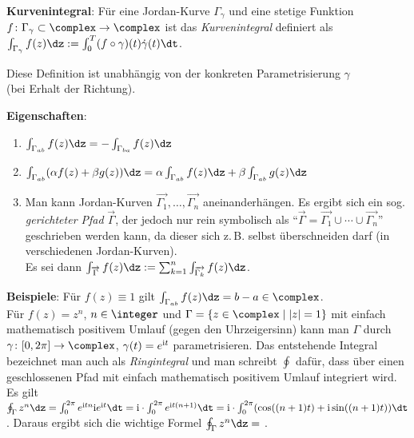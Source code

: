 \textbf{Kurvenintegral}:
Für eine Jordan-Kurve $\Gamma_\gamma$ und eine stetige Funktion
$f\colon \Gamma_\gamma \subset \complex \rightarrow \complex$ ist das
\emph{Kurvenintegral} definiert als $\int_{\Gamma_\gamma} f(z)\dz
:= \int_0^T (f \circ \gamma)(t) \dot{\gamma}(t) \dt$.

Diese Definition ist unabhängig von der konkreten Parametrisierung $\gamma$\\
(bei Erhalt der Richtung).

\linie

\textbf{Eigenschaften}:
\begin{enumerate}
    \item
    $\int_{\Gamma_{ab}} f(z)\dz = -\int_{\Gamma_{ba}} f(z)\dz$

    \item
    $\int_{\Gamma_{ab}} (\alpha f(z) + \beta g(z))\dz =
    \alpha \int_{\Gamma_{ab}} f(z)\dz + \beta \int_{\Gamma_{ab}} g(z)\dz$

    \item
    Man kann Jordan-Kurven
    $\overrightarrow{\Gamma_1}, \dotsc, \overrightarrow{\Gamma_n}$
    aneinanderhängen.
    Es ergibt sich ein sog. \emph{gerichteter Pfad} $\overrightarrow{\Gamma}$,
    der jedoch nur rein symbolisch als
    "`$\overrightarrow{\Gamma} =
    \overrightarrow{\Gamma_1} \cup \dotsb \cup \overrightarrow{\Gamma_n}$"'
    geschrieben werden kann, da dieser sich z.\,B. selbst überschneiden darf
    (in verschiedenen Jordan-Kurven).\\
    Es sei dann $\int_{\overrightarrow{\Gamma}} f(z)\dz :=
    \sum_{k=1}^n \int_{\overrightarrow{\Gamma_k}} f(z)\dz$.
\end{enumerate}

\textbf{Beispiele}:
Für $f(z) \equiv 1$ gilt $\int_{\Gamma_{ab}} f(z)\dz = b - a \in \complex$.\\
Für $f(z) = z^n$, $n \in \integer$ und
$\Gamma = \{z \in \complex \;|\; |z| = 1\}$ mit einfach mathematisch positivem
Umlauf (gegen den Uhrzeigersinn) kann man $\Gamma$ durch
$\gamma\colon [0, 2\pi] \rightarrow \complex$, $\gamma(t) = e^{\mathrm{i} t}$
parametrisieren.
Das entstehende Integral bezeichnet man auch als \emph{Ringintegral}
und man schreibt $\oint$ dafür, dass über einen geschlossenen Pfad
mit einfach mathematisch positivem Umlauf integriert wird.\\
Es gilt $\oint_\Gamma z^n \dz = \int_0^{2\pi} e^{\i tn} \i e^{\i t} \dt
= \i \cdot \int_0^{2\pi} e^{\i t(n+1)} \dt
= \i \cdot \int_0^{2\pi} (\cos((n+1)t) + \i \sin((n+1)t)) \dt$.
Daraus ergibt sich die wichtige Formel
$\oint_\Gamma z^n \dz =$
.

